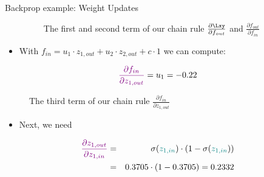 \begin{vbframe}{Backprop example: Weight Updates}
\begin{itemize}
\begin{figure}
      \caption{The first and second term of our chain rule $\frac{\partial \Lxy}{\partial f_{out}}$ and $\frac{\partial f_{out}}{\partial f_{in}}$}
  \end{figure}
\framebreak
    \item With $f_{in} = u_1 \cdot z_{1,out} + u_2 \cdot z_{2,out} + c \cdot 1$ we can compute:
  \end{itemize}
  \begin{eqnarray*}
    \textcolor{violet}{\frac{\partial f_{in}}{\partial z_{1,out}}} = u_1 = -0.22
  \end{eqnarray*}
  \begin{figure}
    \centering
      \caption{The third term of our chain rule $\frac{\partial f_{in}}{\partial z_{1,out}}$}
  \end{figure}
\framebreak
  \begin{itemize}
    \item Next, we need
  \end{itemize}
  \begin{eqnarray*}
    \textcolor{violet}{\frac{\partial z_{1,out}}{\partial z_{1,in}}}  &=& \sigma(\textcolor{teal}{z_{1,in}}) \cdot (1-\sigma(\textcolor{teal}{z_{1,in}})) \\&=&  \num[round-mode=places,round-precision=4]{0.3705169} \cdot (1 - \num[round-mode=places,round-precision=4]{0.3705169}) = \num[round-mode=places,round-precision=4]{0.2332341}
  \end{eqnarray*}
  \begin{figure}
    \centering

\end{figure}
\end{vbframe}
